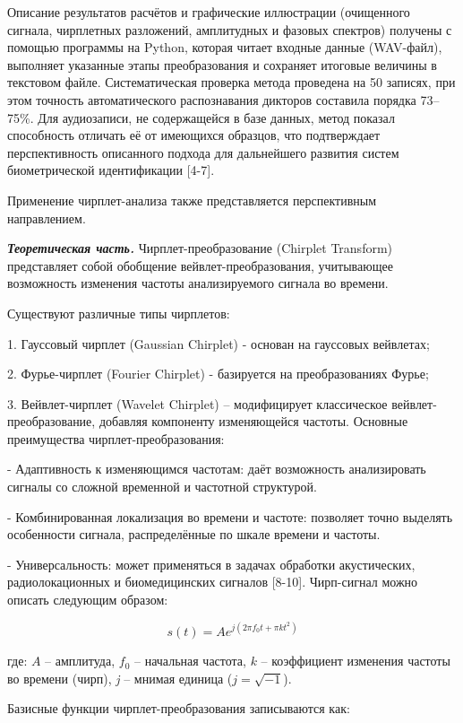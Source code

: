 \begin{multicols}{2}
Описание результатов расчётов и графические иллюстрации (очищенного
сигнала, чирплетных разложений, амплитудных и фазовых спектров) получены
с помощью программы на Python, которая читает входные данные (WAV-файл),
выполняет указанные этапы преобразования и сохраняет итоговые величины в
текстовом файле. Систематическая проверка метода проведена на 50
записях, при этом точность автоматического распознавания дикторов
составила порядка 73--75\%. Для аудиозаписи, не содержащейся в базе
данных, метод показал способность отличать её от имеющихся образцов, что
подтверждает перспективность описанного подхода для дальнейшего развития
систем биометрической идентификации {[}4-7{]}.

Применение чирплет-анализа также представляется перспективным
направлением.

\emph{{\bfseries Теоретическая часть.}} Чирплет-преобразование (Chirplet
Transform) представляет собой обобщение вейвлет-преобразования,
учитывающее возможность изменения частоты анализируемого сигнала во
времени.

Существуют различные типы чирплетов:

1. Гауссовый чирплет (Gaussian Chirplet) - основан на гауссовых
вейвлетах;

2. Фурье-чирплет (Fourier Chirplet) - базируется на преобразованиях
Фурье;

3. Вейвлет-чирплет (Wavelet Chirplet) -- модифицирует классическое
вейвлет-преобразование, добавляя компоненту изменяющейся частоты.
Основные преимущества чирплет-преобразования:

- Адаптивность к изменяющимся частотам: даёт возможность анализировать
сигналы со сложной временной и частотной структурой.

- Комбинированная локализация во времени и частоте: позволяет точно
выделять особенности сигнала, распределённые по шкале времени и
частоты.

- Универсальность: может применяться в задачах обработки акустических,
радиолокационных и биомедицинских сигналов {[}8-10{]}.
Чирп-сигнал можно описать следующим образом:

\begin{equation}
s(t)=Ae^{j(2\pi f_0t+\pi kt^2)}
\end{equation}

где: $A$ -- амплитуда, $f_0$ -- начальная частота, $k$ --
коэффициент изменения частоты во времени
(чирп), \emph{j} -- мнимая единица
($j=\sqrt{-1}$).

Базисные функции чирплет-преобразования записываются как:


\end{multicols}
